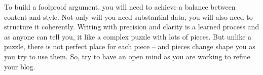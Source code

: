 \documentclass{tufte-handout}\usepackage[]{graphicx}\usepackage[]{color}
\newenvironment{enumerate*}%
  {\begin{enumerate}%
    \setlength{\itemsep}{0pt}%
    \setlength{\parskip}{0pt}}%
  {\end{enumerate}}
\begin{document}
To build a foolproof argument, you will need to achieve a balance between content and style. Not only will you need substantial data, you will also need to structure it coherently. Writing with precision and clarity is a learned process and as anyone can tell you, it like a complex puzzle with lots of pieces. But unlike a puzzle, there is not perfect place for each piece -- and pieces change shape you as you try to use them. So, try to have an open mind as you are working to refine your blog. 










\end{document}
